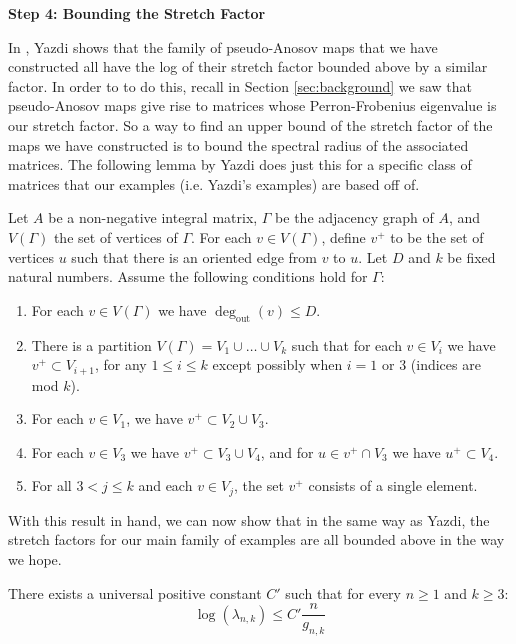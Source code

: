 \begin{center}
\textbf{Step 4: Bounding the Stretch Factor}
\end{center}

In \cite{yazdi2018pseudo}, Yazdi shows that the family of pseudo-Anosov maps that we have constructed all have the log of their stretch factor bounded above by a similar factor. In order to to do this, recall in Section \ref{sec:background} we saw that pseudo-Anosov maps give rise to matrices whose Perron-Frobenius eigenvalue is our stretch factor. So a way to find an upper bound of the stretch factor of the maps we have constructed is to bound the spectral radius of the associated matrices. The following lemma by Yazdi does just this for a specific class of matrices that our examples (i.e. Yazdi's examples) are based off of.

\begin{lem}[Yazdi]
\label{lem:spectral}
Let $A$ be a non-negative integral matrix, $\Gamma$ be the adjacency graph of $A$, and $V(\Gamma)$ the set of vertices of $\Gamma$. For each $v \in V(\Gamma)$, define $v^+$ to be the set of vertices $u$ such that there is an oriented edge from $v$ to $u$. Let $D$ and $k$ be fixed natural numbers. Assume the following conditions hold for $\Gamma$: \begin{enumerate}
    \item For each $v \in V(\Gamma)$ we have $\deg_{\text{out}}(v) \leq D$.
    \item There is a partition $V(\Gamma) = V_1 \cup \dots \cup V_k$ such that for each $v \in V_i$ we have $v^+ \subset V_{i+1}$, for any $1 \leq i \leq k$ except possibly when $i = 1$ or 3 (indices are mod $k$).
    \item For each $v \in V_1$, we have $v^+ \subset V_2 \cup V_3$.
    \item For each $v \in V_3$ we have $v^+ \subset V_3 \cup V_4$, and for $u \in v^+ \cap V_3$ we have $u^+ \subset V_4$.
    \item For all $3 < j \leq k$ and each $v \in V_j$, the set $v^+$ consists of a single element.
\end{enumerate}
\end{lem}

With this result in hand, we can now show that in the same way as Yazdi, the stretch factors for our main family of examples are all bounded above in the way we hope.

\begin{lem}
There exists a universal positive constant $C'$ such that for every $n \geq 1$ and $k \geq 3$:
$$\log(\lambda_{n,k}) \leq C'\frac{n}{g_{n,k}}$$
\end{lem}

